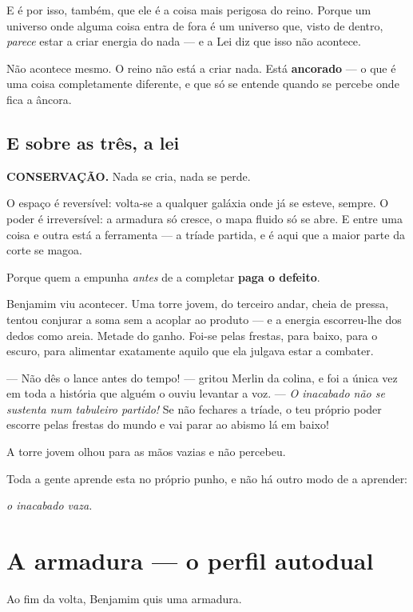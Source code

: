 \documentclass[livro.tex]{subfiles}
\begin{document}
E é por isso, também, que ele é a coisa mais perigosa do reino. Porque um universo onde alguma coisa entra de fora
é um universo que, visto de dentro, \emph{parece} estar a criar energia do nada --- e a Lei diz que isso não
acontece.

Não acontece mesmo. O reino não está a criar nada. Está \textbf{ancorado} --- o que é uma coisa completamente
diferente, e que só se entende quando se percebe onde fica a âncora.

\section*{E sobre as três, a lei}

\textbf{CONSERVAÇÃO.} Nada se cria, nada se perde.

O espaço é reversível: volta-se a qualquer galáxia onde já se esteve, sempre. O poder é irreversível: a armadura só
cresce, o mapa fluido só se abre. E entre uma coisa e outra está a ferramenta --- a tríade partida, e é aqui que a maior parte da corte se magoa.

Porque quem a empunha \emph{antes} de a completar \textbf{paga o defeito}.

Benjamim viu acontecer. Uma torre jovem, do terceiro andar, cheia de pressa, tentou conjurar a soma sem a acoplar ao
produto --- e a energia escorreu-lhe dos dedos como areia. Metade do ganho. Foi-se pelas frestas, para baixo, para
o escuro, para alimentar exatamente aquilo que ela julgava estar a combater.

--- Não dês o lance antes do tempo! --- gritou Merlin da colina, e foi a única vez em toda a história que alguém o
ouviu levantar a voz. --- \emph{O inacabado não se sustenta num tabuleiro partido!} Se não fechares a tríade, o teu
próprio poder escorre pelas frestas do mundo e vai parar ao abismo lá em baixo!

A torre jovem olhou para as mãos vazias e não percebeu.

Toda a gente aprende esta no próprio punho, e não há outro modo de a aprender:

\begin{center}\itshape
o inacabado vaza.
\end{center}


\chapter{A armadura --- o perfil autodual}

Ao fim da volta, Benjamim quis uma armadura.
\end{document}

